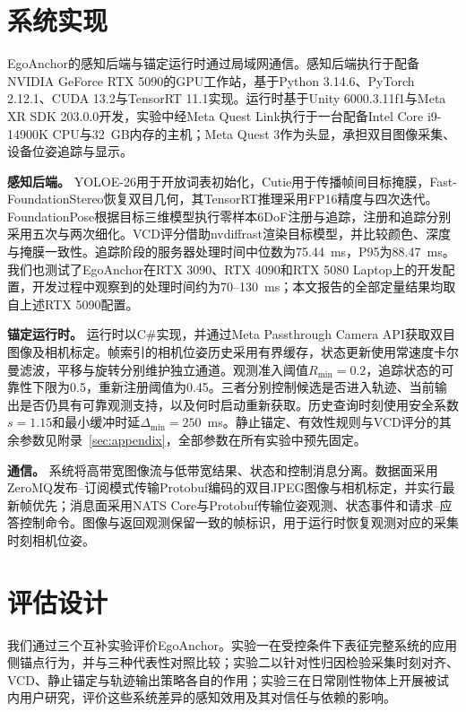 \documentclass[review]{vgtc}
\begin{document}
\section{系统实现}\label{sec:implementation}

EgoAnchor的感知后端与锚定运行时通过局域网通信。感知后端执行于配备NVIDIA GeForce RTX 5090的GPU工作站，基于Python 3.14.6、PyTorch 2.12.1、CUDA 13.2与TensorRT 11.1实现。运行时基于Unity 6000.3.11f1与Meta XR SDK 203.0.0开发，实验中经Meta Quest Link执行于一台配备Intel Core i9-14900K CPU与32~GB内存的主机；Meta Quest 3作为头显，承担双目图像采集、设备位姿追踪与显示。

\textbf{感知后端。}
YOLOE-26用于开放词表初始化，Cutie用于传播帧间目标掩膜，Fast-FoundationStereo恢复双目几何，其TensorRT推理采用FP16精度与四次迭代。FoundationPose根据目标三维模型执行零样本6DoF注册与追踪，注册和追踪分别采用五次与两次细化。VCD评分借助nvdiffrast渲染目标模型，并比较颜色、深度与掩膜一致性。追踪阶段的服务器处理时间中位数为75.44~ms，P95为88.47~ms。我们也测试了EgoAnchor在RTX 3090、RTX 4090和RTX 5080 Laptop上的开发配置，开发过程中观察到的处理时间约为70--130~ms；本文报告的全部定量结果均取自上述RTX 5090配置。

\textbf{锚定运行时。}
运行时以C\#实现，并通过Meta Passthrough Camera API获取双目图像及相机标定。帧索引的相机位姿历史采用有界缓存，状态更新使用常速度卡尔曼滤波，平移与旋转分别维护独立通道。观测准入阈值$R_{\min}=0.2$，追踪状态的可靠性下限为0.5，重新注册阈值为0.45。三者分别控制候选是否进入轨迹、当前输出是否仍具有可靠观测支持，以及何时启动重新获取。历史查询时刻使用安全系数$s=1.15$和最小缓冲时延$\Delta_{\min}=250$~ms。静止锚定、有效性规则与VCD评分的其余参数见附录~\ref{sec:appendix}，全部参数在所有实验中预先固定。

\textbf{通信。}
系统将高带宽图像流与低带宽结果、状态和控制消息分离。数据面采用ZeroMQ发布--订阅模式传输Protobuf编码的双目JPEG图像与相机标定，并实行最新帧优先；消息面采用NATS Core与Protobuf传输位姿观测、状态事件和请求--应答控制命令。图像与返回观测保留一致的帧标识，用于运行时恢复观测对应的采集时刻相机位姿。

\section{评估设计}\label{sec:evaluation}

我们通过三个互补实验评价EgoAnchor。实验一在受控条件下表征完整系统的应用侧锚点行为，并与三种代表性对照比较；实验二以针对性归因检验采集时刻对齐、VCD、静止锚定与轨迹输出策略各自的作用；实验三在日常刚性物体上开展被试内用户研究，评价这些系统差异的感知效用及其对信任与依赖的影响。
\end{document}

